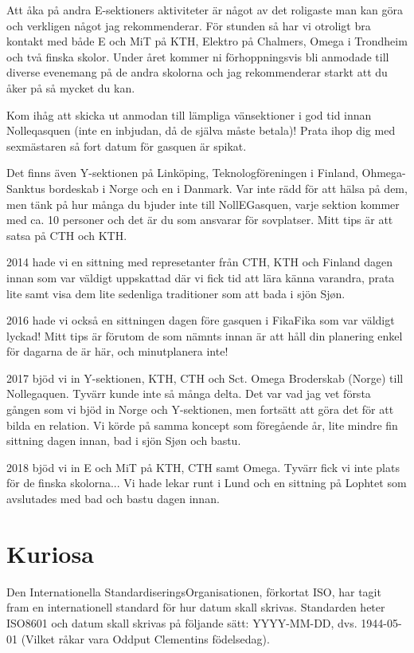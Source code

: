 \documentclass[10pt]{article}
\begin{document}
Att åka på andra E-sektioners aktiviteter är något av det roligaste man kan göra och verkligen något jag rekommenderar. För stunden så har vi otroligt bra kontakt med både E och MiT på KTH, Elektro på Chalmers, Omega i Trondheim och två finska skolor. Under året kommer ni förhoppningsvis bli anmodade till diverse evenemang på de andra skolorna och jag rekommenderar starkt att du åker på så mycket du kan.

Kom ihåg att skicka ut anmodan till lämpliga vänsektioner i god tid innan Nolleqasquen (inte en inbjudan, då de själva måste betala)! Prata ihop dig med sexmästaren så fort datum för gasquen är spikat.

Det finns även Y-sektionen på Linköping, Teknologföreningen i Finland, Ohmega-Sanktus bordeskab i Norge och en i Danmark. Var inte rädd för att hälsa på dem, men tänk på hur många du bjuder inte till NollEGasquen, varje sektion kommer med ca. 10 personer och det är du som ansvarar för sovplatser. Mitt tips är att satsa på CTH och KTH.

2014 hade vi en sittning med represetanter från CTH, KTH och Finland dagen innan som var väldigt uppskattad där vi fick tid att lära känna varandra, prata lite samt visa dem lite sedenliga traditioner som att bada i sjön Sj\o n.

2016 hade vi också en sittningen dagen före gasquen i FikaFika som var väldigt lyckad! Mitt tips är förutom de som nämnts innan är att håll din planering enkel för dagarna de är här, och minutplanera inte!

2017 bjöd vi in Y-sektionen, KTH, CTH och Sct. Omega Broderskab (Norge) till Nollegaquen. Tyvärr kunde inte så många delta. Det var vad jag vet första gången som vi bjöd in Norge och Y-sektionen, men fortsätt att göra det för att bilda en relation. Vi körde på samma koncept som föregående år, lite mindre fin sittning dagen innan, bad i sjön Sj\o n och bastu.

2018 bjöd vi in E och MiT på KTH, CTH samt Omega. Tyvärr fick vi inte plats för de finska skolorna... Vi hade lekar runt i Lund och en sittning på Lophtet som avslutades med bad och bastu dagen innan. 
\newpage
\section{Kuriosa}
Den Internationella StandardiseringsOrganisationen, förkortat ISO, har tagit fram en internationell standard för hur datum skall skrivas. Standarden heter ISO8601 och datum skall skrivas på följande sätt: YYYY-MM-DD, dvs. 1944-05-01 (Vilket råkar vara Oddput Clementins födelsedag).
\end{document}
